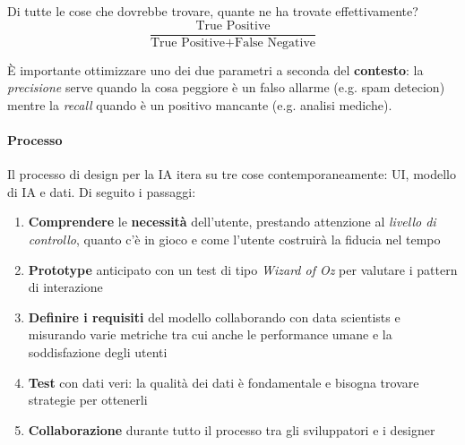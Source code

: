 \begin{definition}[Recall]
	Di tutte le cose che dovrebbe trovare, quante ne ha trovate effettivamente?
	\begin{equation*}
		\frac{\text{True Positive}}{\text{True Positive} + \text{False Negative}}
	\end{equation*}
\end{definition}

È importante ottimizzare uno dei due parametri a seconda del \textbf{contesto}: la \textit{precisione} serve quando la cosa peggiore è un falso allarme (e.g. spam detecion) mentre la \textit{recall} quando è un positivo mancante (e.g. analisi mediche).

\paragraph{Processo} Il processo di design per la IA itera su tre cose contemporaneamente: UI, modello di IA e dati. Di seguito i passaggi:
\begin{enumerate}
	\item \textbf{Comprendere} le \textbf{necessità} dell'utente, prestando attenzione al \textit{livello di controllo}, quanto c'è in gioco e come l'utente costruirà la fiducia nel tempo
	\item \textbf{Prototype} anticipato con un test di tipo \textit{Wizard of Oz} per valutare i pattern di interazione
	\item \textbf{Definire i requisiti} del modello collaborando con data scientists e misurando varie metriche tra cui anche le performance umane e la soddisfazione degli utenti
	\item \textbf{Test} con dati veri: la qualità dei dati è fondamentale e bisogna trovare strategie per ottenerli
	\item \textbf{Collaborazione} durante tutto il processo tra gli sviluppatori e i designer
\end{enumerate}